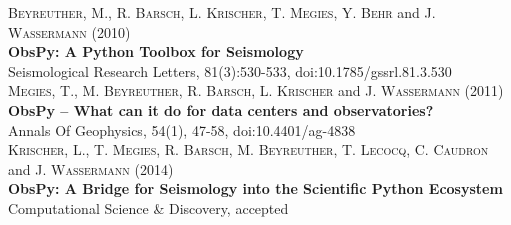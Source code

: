 \footnotesize
B\textsc{eyreuther}, M., R. B\textsc{arsch}, L. K\textsc{rischer}, T. M\textsc{egies}, Y. B\textsc{ehr} and J. W\textsc{assermann} (2010)\\
\textbf{ObsPy: A Python Toolbox for Seismology}\\
Seismological Research Letters, 81(3):530-533, doi:10.1785/​gssrl.81.3.530\\

M\textsc{egies}, T., M. B\textsc{eyreuther}, R. B\textsc{arsch}, L. K\textsc{rischer} and J. W\textsc{assermann} (2011)\\
\textbf{ObsPy – What can it do for data centers and observatories?}\\
Annals Of Geophysics, 54(1), 47-58, doi:10.4401/ag-4838\\

K\textsc{rischer}, L., T. M\textsc{egies}, R. B\textsc{arsch}, M. B\textsc{eyreuther}, T. L\textsc{ecocq}, C. C\textsc{audron} and J. W\textsc{assermann} (2014)\\
\textbf{ObsPy: A Bridge for Seismology into the Scientific Python Ecosystem}\\
Computational Science \& Discovery, accepted
